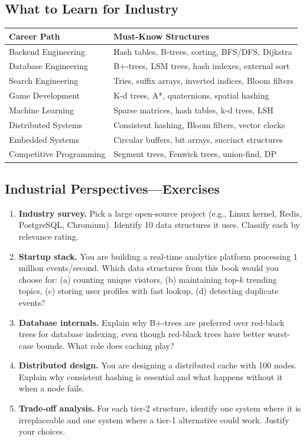 \subsection{What to Learn for Industry}

\begin{center}
\small
\begin{tabular}{ll}
\toprule
\textbf{Career Path} & \textbf{Must-Know Structures} \\
\midrule
Backend Engineering & Hash tables, B-trees, sorting, BFS/DFS, Dijkstra \\
Database Engineering & B+-trees, LSM trees, hash indexes, external sort \\
Search Engineering & Tries, suffix arrays, inverted indices, Bloom filters \\
Game Development & K-d trees, A*, quaternions, spatial hashing \\
Machine Learning & Sparse matrices, hash tables, k-d trees, LSH \\
Distributed Systems & Consistent hashing, Bloom filters, vector clocks \\
Embedded Systems & Circular buffers, bit arrays, succinct structures \\
Competitive Programming & Segment trees, Fenwick trees, union-find, DP \\
\bottomrule
\end{tabular}
\end{center}

\subsection{Industrial Perspectives---Exercises}

\begin{enumerate}
\item \textbf{Industry survey.} Pick a large open-source project (e.g., Linux kernel, Redis, PostgreSQL, Chromium). Identify 10 data structures it uses. Classify each by relevance rating.

\item \textbf{Startup stack.} You are building a real-time analytics platform processing 1 million events/second. Which data structures from this book would you choose for: (a) counting unique visitors, (b) maintaining top-$k$ trending topics, (c) storing user profiles with fast lookup, (d) detecting duplicate events?

\item \textbf{Database internals.} Explain why B+-trees are preferred over red-black trees for database indexing, even though red-black trees have better worst-case bounds. What role does caching play?

\item \textbf{Distributed design.} You are designing a distributed cache with 100 nodes. Explain why consistent hashing is essential and what happens without it when a node fails.

\item \textbf{Trade-off analysis.} For each tier-2 structure, identify one system where it is irreplaceable and one system where a tier-1 alternative could work. Justify your choices.
\end{enumerate}

